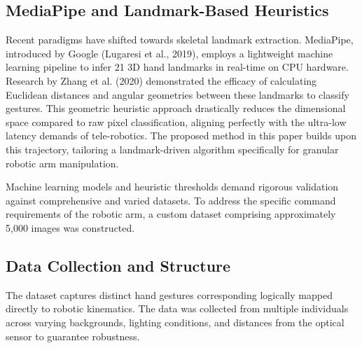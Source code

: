 \documentclass[conference]{IEEEtran}
\begin{document}
\subsection{MediaPipe and Landmark-Based Heuristics}
Recent paradigms have shifted towards skeletal landmark extraction. MediaPipe, introduced by Google (Lugaresi et al., 2019), employs a lightweight machine learning pipeline to infer 21 3D hand landmarks in real-time on CPU hardware. Research by Zhang et al. (2020) demonstrated the efficacy of calculating Euclidean distances and angular geometries between these landmarks to classify gestures. This geometric heuristic approach drastically reduces the dimensional space compared to raw pixel classification, aligning perfectly with the ultra-low latency demands of tele-robotics. The proposed method in this paper builds upon this trajectory, tailoring a landmark-driven algorithm specifically for granular robotic arm manipulation.

Machine learning models and heuristic thresholds demand rigorous validation against comprehensive and varied datasets. To address the specific command requirements of the robotic arm, a custom dataset comprising approximately 5,000 images was constructed.

\subsection{Data Collection and Structure}
The dataset captures distinct hand gestures corresponding logically mapped directly to robotic kinematics. The data was collected from multiple individuals across varying backgrounds, lighting conditions, and distances from the optical sensor to guarantee robustness.
\end{document}

